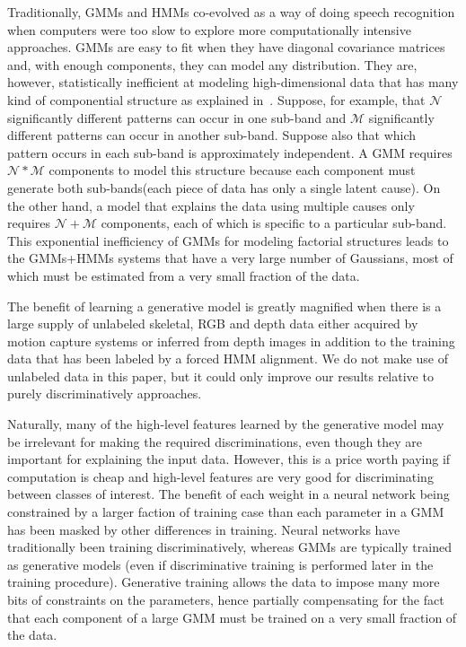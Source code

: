 Traditionally, GMMs and HMMs co-evolved as a way of doing speech recognition when computers were too slow to explore more computationally intensive approaches. GMMs are easy to fit when they have diagonal covariance matrices and, with enough components, they can model any distribution. They are, however, statistically inefficient at modeling high-dimensional data that has many kind of componential structure as explained in~\cite{mohamed2012acoustic}. Suppose, for example, that $\mathcal{N}$ significantly different patterns can occur in one sub-band and $\mathcal{M}$ significantly different patterns can occur in another sub-band. Suppose also that which pattern occurs in each sub-band is approximately independent. A GMM requires $\mathcal{N*M}$ components to model this structure because each component must generate both sub-bands(each piece of data has only a single latent cause). On the other hand, a model that explains the data using multiple causes only requires $\mathcal{N+M}$ components, each of which is specific to a particular sub-band. This exponential inefficiency of GMMs for modeling factorial structures leads to the GMMs+HMMs systems that have a very large number of Gaussians, most of which must be estimated from a very small fraction of the data.

The benefit of learning a generative model is greatly magnified when there is a large supply of unlabeled skeletal, RGB and depth data either acquired by motion capture systems or inferred from depth images in addition to the training data that has been labeled by a forced HMM alignment. We do not make use of unlabeled data in this paper, but it could only improve our results relative to purely discriminatively approaches.

Naturally, many of the high-level features learned by the generative model may be irrelevant for making the required discriminations, even though they are important for explaining the input data. However, this is a price worth paying if computation is cheap and high-level features are very good for discriminating between classes of interest.
The benefit of each weight in a neural network being constrained by a larger faction of training case than each parameter in a GMM has been masked by other differences in training. Neural networks have traditionally been training discriminatively, whereas GMMs are typically trained as generative models (even if discriminative training is performed later in the training procedure). Generative training allows the data to impose many more bits of constraints on the parameters, hence partially compensating for the fact that each component of a large GMM must be trained on a very small fraction of the data.

